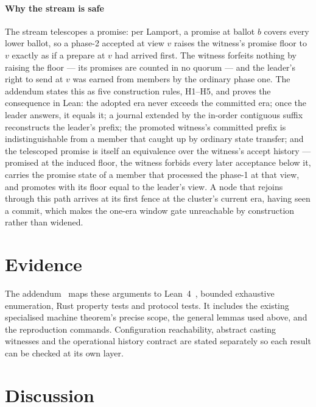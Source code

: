 \documentclass[10pt,journal,letterpaper]{IEEEtran}
\begin{document}
\paragraph{Why the stream is safe}
The stream telescopes a promise: per Lamport, a promise at ballot $b$
covers every lower ballot, so a phase-2 accepted at view $v$ raises the
witness's promise floor to $v$ exactly as if a prepare at $v$ had arrived
first. The witness forfeits nothing by raising the floor --- its promises
are counted in no quorum --- and the leader's right to send at $v$ was
earned from members by the ordinary phase one. The addendum states this
as five construction rules, H1--H5, and proves the consequence in Lean:
the adopted era never exceeds the committed era; once the leader answers,
it equals it; a journal extended by the in-order contiguous suffix
reconstructs the leader's prefix; the promoted witness's committed
prefix is indistinguishable from a member that caught up by ordinary state
transfer; and the telescoped promise is itself an equivalence over the
witness's accept history --- promised at the induced floor, the witness
forbids every later acceptance below it, carries the promise state of a
member that processed the phase-1 at that view, and promotes with its
floor equal to the leader's view. A node that rejoins through this path arrives at its first fence
at the cluster's current era, having seen a commit, which makes the
one-era window gate unreachable by construction rather than widened.

\section{Evidence}\label{sec:evidence}
The addendum~\cite{artifact} maps these arguments to Lean~4~\cite{lean4}, bounded exhaustive enumeration, Rust property tests and protocol tests. It includes the existing specialised machine theorem's precise scope, the general lemmas used above, and the reproduction commands. Configuration reachability, abstract casting witnesses and the operational history contract are stated separately so each result can be checked at its own layer.

\section{Discussion}\label{sec:discussion}
\end{document}
